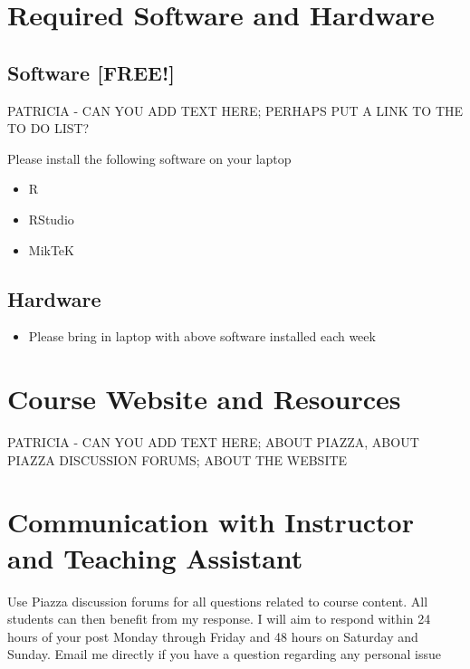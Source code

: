 \documentclass[11pt,]{article}
\providecommand{\tightlist}{%
  \setlength{\itemsep}{0pt}\setlength{\parskip}{0pt}}
\begin{document}
\section{Required Software and
Hardware}\label{required-software-and-hardware}

\subsection{Software {[}FREE!{]}}\label{software-free}

PATRICIA - CAN YOU ADD TEXT HERE; PERHAPS PUT A LINK TO THE TO DO LIST?

Please install the following software on your laptop

\begin{itemize}
\tightlist
\item
  R
\item
  RStudio
\item
  MikTeK
\end{itemize}

\subsection{Hardware}\label{hardware}

\begin{itemize}
\tightlist
\item
  Please bring in laptop with above software installed each week
\end{itemize}

\section{Course Website and
Resources}\label{course-website-and-resources}

PATRICIA - CAN YOU ADD TEXT HERE; ABOUT PIAZZA, ABOUT PIAZZA DISCUSSION
FORUMS; ABOUT THE WEBSITE

\section{Communication with Instructor and Teaching
Assistant}\label{communication-with-instructor-and-teaching-assistant}

Use Piazza discussion forums for all questions related to course
content. All students can then benefit from my response. I will aim to
respond within 24 hours of your post Monday through Friday and 48 hours
on Saturday and Sunday. Email me directly if you have a question
regarding any personal issue
\end{document}
